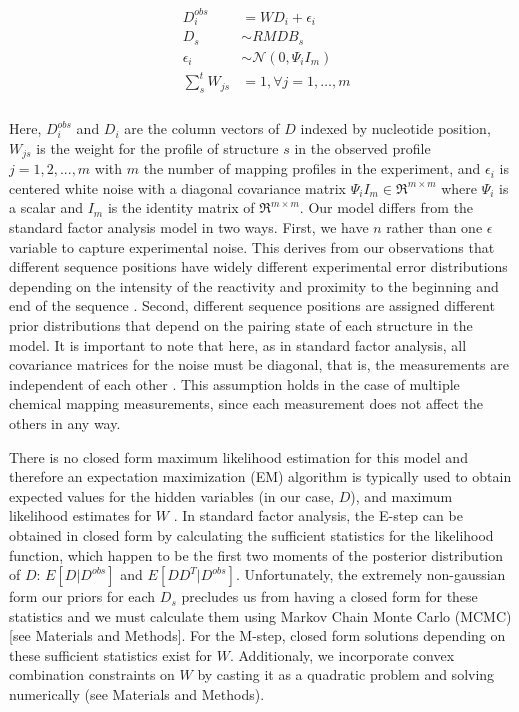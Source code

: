 \documentclass[12pt]{article}
\begin{document}
\begin{align}
  &\begin{aligned}\label{reeffit_model}
    D^{obs}_{i} &= WD_{i} + \epsilon_{i}\\
    D_{s} &\sim RMDB_{s} \\
    \epsilon_{i} &\sim \mathcal{N}(0, \Psi_{i}I_{m}) \\
    \sum_{s}^{t} W_{js} &= 1, \forall j = 1, …, m\\
  \end{aligned}
\end{align}


Here, $D^{obs}_{i}$ and $D_{i}$ are the column vectors of $D$ indexed by nucleotide position, $W_{js}$ is the weight for the profile of structure $s$ in the observed profile $j = 1 , 2, ..., m$ with $m$ the number of mapping profiles in the experiment, and $\epsilon_{i}$ is centered white noise with a diagonal covariance matrix $\Psi_{i}I_{m} \in \Re^{m \times m}$ where $\Psi_{i}$ is a scalar and $I_{m}$ is the identity matrix of $\Re^{m \times m}$. Our model differs from the standard factor analysis model \cite{Ghahramani1996} in two ways. First, we have $n$ rather than one $\epsilon$ variable to capture experimental noise. This derives from our observations that different sequence positions have widely different experimental error distributions depending on the intensity of the reactivity and proximity to the beginning and end of the sequence \cite{Kladwang2011}. Second, different sequence positions are assigned different prior distributions that depend on the pairing state of each structure in the model. It is important to note that here, as in standard factor analysis, all covariance matrices for the noise must be diagonal, that is, the measurements are independent of each other \cite{Ghahramani1996,Rubin1982}. This assumption holds in the case of multiple chemical mapping measurements, since each measurement does not affect the others in any way.

There is no closed form maximum likelihood estimation for this model and therefore an expectation maximization (EM) algorithm is typically used to obtain expected values for the hidden variables (in our case, $D$), and maximum likelihood estimates for $W$ \cite{Ghahramani1996,Rubin1982}. In standard factor analysis, the E-step can be obtained in closed form by calculating the sufficient statistics for the likelihood function, which happen to be the first two moments of the posterior distribution of $D$: $E[D | D^{obs}]$ and $E[DD^T | D^{obs}]$. Unfortunately, the extremely non-gaussian form our priors for each $D_{s}$ precludes us from having a closed form for these statistics and we must calculate them using Markov Chain Monte Carlo (MCMC) [see Materials and Methods]. For the M-step, closed form solutions depending on these sufficient statistics exist for $W$. Additionaly, we incorporate convex combination constraints on $W$ by casting it as a quadratic problem and solving numerically (see Materials and Methods).
\end{document}

